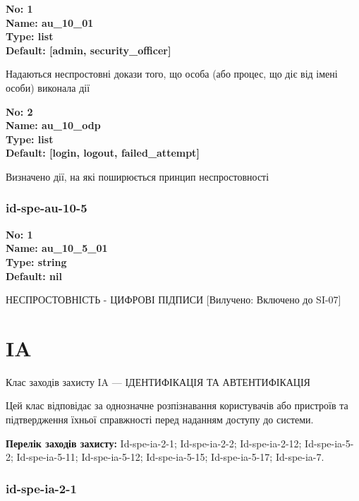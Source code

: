 \documentclass{article}
\begin{document}
\vspace{10pt}
{\footnotesize\bfseries
No: 1\\
Name: au\_\allowbreak{}10\_\allowbreak{}01\\
Type: list\\
Default: [\textquotedbl{}admin\textquotedbl{}, \textquotedbl{}security\_\allowbreak{}officer\textquotedbl{}]
}

{\footnotesize Надаються неспростовні докази того, що особа (або процес, що діє від імені особи) виконала дії}


{\footnotesize\bfseries
No: 2\\
Name: au\_\allowbreak{}10\_\allowbreak{}odp\\
Type: list\\
Default: [\textquotedbl{}login\textquotedbl{}, \textquotedbl{}logout\textquotedbl{}, \textquotedbl{}failed\_\allowbreak{}attempt\textquotedbl{}]
}

{\footnotesize Визначено дії, на які поширюється принцип неспростовності}




\subsubsection{id-spe-au-10-5}


\vspace{10pt}
{\footnotesize\bfseries
No: 1\\
Name: au\_\allowbreak{}10\_\allowbreak{}5\_\allowbreak{}01\\
Type: string\\
Default: nil
}

{\footnotesize НЕСПРОСТОВНІСТЬ - ЦИФРОВІ ПІДПИСИ [Вилучено: Включено до SI-07]}




\section{IA}
Клас заходів захисту IA --- ІДЕНТИФІКАЦІЯ ТА АВТЕНТИФІКАЦІЯ

Цей клас відповідає за однозначне розпізнавання користувачів або пристроїв та підтвердження їхньої справжності перед наданням доступу до системи.

\textbf{Перелік заходів захисту:} Id-spe-ia-2-1; Id-spe-ia-2-2; Id-spe-ia-2-12; Id-spe-ia-5-2; Id-spe-ia-5-11; Id-spe-ia-5-12; Id-spe-ia-5-15; Id-spe-ia-5-17; Id-spe-ia-7.

\subsubsection{id-spe-ia-2-1}
\end{document}
